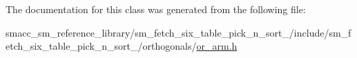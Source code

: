 The documentation for this class was generated from the following file\+:\begin{DoxyCompactItemize}
\item 
smacc\+\_\+sm\+\_\+reference\+\_\+library/sm\+\_\+fetch\+\_\+six\+\_\+table\+\_\+pick\+\_\+n\+\_\+sort\+\_/include/sm\+\_\+fetch\+\_\+six\+\_\+table\+\_\+pick\+\_\+n\+\_\+sort\+\_/orthogonals/\hyperlink{sm__fetch__six__table__pick__n__sort__1_2include_2sm__fetch__six__table__pick__n__sort__1_2orthogonals_2or__arm_8h}{or\+\_\+arm.\+h}\end{DoxyCompactItemize}
